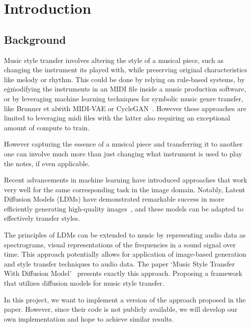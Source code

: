 \section{Introduction}

\subsection{Background}
Music style transfer involves altering the style of a musical piece, 
such as changing the instrument its played with, 
while preserving original characteristics like melody or rhythm.
This could be done by relying on rule-based systems, 
by e\.g\. modifying the instruments in an MIDI file inside a music production software, 
or by leveraging machine learning techniques for symbolic music genre transfer, like Brunner et al\. with MIDI-VAE or CycleGAN~\cite{Brunner2018MIDIVAEMD, Brunner2018SymbolicMG}.
However these approaches are limited to leveraging midi files with the latter also requiring an exceptional amount of compute to train.


However capturing the essence of a musical piece and transferring it to another one can involve much more than just 
changing what instrument is used to play the notes, if even applicable.

Recent advancements in machine learning have introduced approaches that work very well for the same corresponding task in 
the image domain. Notably, Latent Diffusion Models (LDMs) have demonstrated remarkable success 
in more efficiently generating high-quality images~\cite{rombach2022high}, and these models can be adapted to effectively transfer styles.

The principles of LDMs can be extended to music by representing audio data as spectrograms, 
visual representations of the frequencies in a sound signal over time.
This approach potentially allows for application of image-based generation and style transfer techniques to audio data.
The paper `Music Style Transfer With Diffusion Model'~\cite{huang2024music} presents exactly this approach. 
Proposing a framework that utilizes diffusion models for music style transfer.

In this project, we want to implement a version of the approach proposed in the paper.
However, since their code is not publicly available, we will develop our own implementation and hope to achieve similar results.


